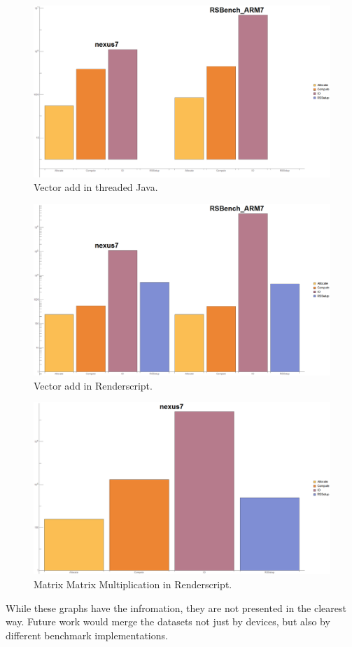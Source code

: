 \begin{figure}[t!]
\includegraphics[scale=0.13]{VectorAddThreadedJava.png}
\caption{Vector add in threaded Java.}
\label{fig:schedule}
\centering
\end{figure}


\begin{figure}[t!]
\includegraphics[scale=0.13]{VectorAddRS.png}
\caption{Vector add in Renderscript.}
\label{fig:schedule}
\centering
\end{figure}


\begin{figure}[t!]
\includegraphics[scale=0.13]{SgemmRS.png}
\caption{Matrix Matrix Multiplication in Renderscript.}
\label{fig:schedule}
\centering
\end{figure}


While these graphs have the infromation, they are not presented in the clearest way.
Future work would merge the datasets not just by devices, but also by different benchmark implementations.

